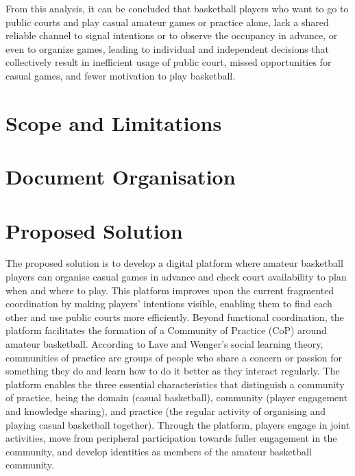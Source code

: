 From this analysis, it can be concluded that basketball players who want to go to public courts and play casual amateur games or practice alone, lack a shared reliable channel to signal intentions or to observe the occupancy in advance, or even to organize games, leading to individual and independent decisions that collectively result in inefficient usage of public court, missed opportunities for casual games, and fewer motivation to play basketball.




\section{Scope and Limitations}
\label{sec:intro-scope}




\section{Document Organisation}
\label{sec:intro-organisation}




\section{Proposed Solution}\label{subsec:proposed-solution}

The proposed solution is to develop a digital platform where amateur basketball players can organise casual games in advance and check court availability to plan when and where to play.
This platform improves upon the current fragmented coordination by making players' intentions visible, enabling them to find each other and use public courts more efficiently. 
Beyond functional coordination, the platform facilitates the formation of a Community of Practice (CoP) around amateur basketball. 
According to Lave and Wenger's social learning theory, communities of practice are groups of people who share a concern or passion for something they do and learn how to do it better as they interact regularly\cite{cop}. 
The platform enables the three essential characteristics that distinguish a community of practice, being the domain (casual basketball), community (player engagement and knowledge sharing), and practice (the regular activity of organising and playing casual basketball together).
Through the platform, players engage in joint activities, move from peripheral participation towards fuller engagement in the community, and develop identities as members of the amateur basketball community.

